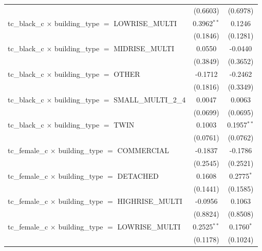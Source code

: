 \begin{tabular}{lcc}
                                                                       & (0.6603)       & (0.6978)\\   
   tc\_black\_c $\times$ building\_type $=$ LOWRISE\_MULTI             & 0.3962$^{**}$  & 0.1246\\   
                                                                       & (0.1846)       & (0.1281)\\   
   tc\_black\_c $\times$ building\_type $=$ MIDRISE\_MULTI             & 0.0550         & -0.0440\\   
                                                                       & (0.3849)       & (0.3652)\\   
   tc\_black\_c $\times$ building\_type $=$ OTHER                      & -0.1712        & -0.2462\\   
                                                                       & (0.1816)       & (0.3349)\\   
   tc\_black\_c $\times$ building\_type $=$ SMALL\_MULTI\_2\_4         & 0.0047         & 0.0063\\   
                                                                       & (0.0699)       & (0.0695)\\   
   tc\_black\_c $\times$ building\_type $=$ TWIN                       & 0.1003         & 0.1957$^{**}$\\   
                                                                       & (0.0761)       & (0.0762)\\   
   tc\_female\_c $\times$ building\_type $=$ COMMERCIAL                & -0.1837        & -0.1786\\   
                                                                       & (0.2545)       & (0.2521)\\   
   tc\_female\_c $\times$ building\_type $=$ DETACHED                  & 0.1608         & 0.2775$^{*}$\\   
                                                                       & (0.1441)       & (0.1585)\\   
   tc\_female\_c $\times$ building\_type $=$ HIGHRISE\_MULTI           & -0.0956        & 0.1063\\   
                                                                       & (0.8824)       & (0.8508)\\   
   tc\_female\_c $\times$ building\_type $=$ LOWRISE\_MULTI            & 0.2525$^{**}$  & 0.1760$^{*}$\\   
                                                                       & (0.1178)       & (0.1024)\\   

\end{tabular}
